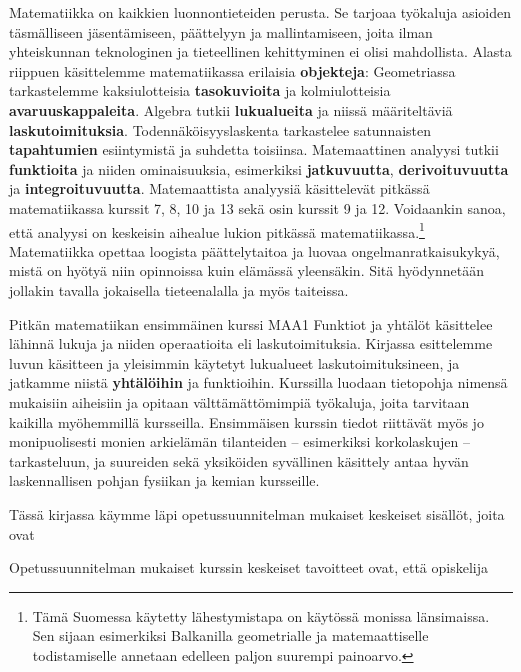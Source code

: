 Matematiikka on kaikkien luonnontieteiden perusta. Se tarjoaa työkaluja asioiden täsmälliseen jäsentämiseen, päättelyyn ja mallintamiseen, joita ilman yhteiskunnan teknologinen ja tieteellinen kehittyminen ei olisi mahdollista. Alasta riippuen käsittelemme matematiikassa erilaisia \textbf{objekteja}: Geometriassa tarkastelemme kaksiulotteisia \textbf{tasokuvioita} ja kolmiulotteisia \textbf{avaruuskappaleita}. Algebra tutkii \textbf{lukualueita} ja niissä määriteltäviä \textbf{laskutoimituksia}. Todennäköisyyslaskenta tarkastelee satunnaisten \textbf{tapahtumien} esiintymistä ja suhdetta toisiinsa. Matemaattinen analyysi tutkii \textbf{funktioita} ja niiden ominaisuuksia, esimerkiksi \textbf{jatkuvuutta}, \textbf{derivoituvuutta} ja \textbf{integroituvuutta}. Matemaattista analyysiä käsittelevät pitkässä matematiikassa kurssit 7, 8, 10 ja 13 sekä osin kurssit 9 ja 12. Voidaankin sanoa, että analyysi on keskeisin aihealue lukion pitkässä matematiikassa.\footnote[1]{Tämä Suomessa käytetty lähestymistapa on käytössä monissa länsimaissa. Sen sijaan esimerkiksi Balkanilla geometrialle ja matemaattiselle todistamiselle annetaan edelleen paljon suurempi painoarvo.} Matematiikka opettaa loogista päättelytaitoa ja luovaa ongelmanratkaisukykyä, mistä on hyötyä niin opinnoissa kuin elämässä yleensäkin. Sitä hyödynnetään jollakin tavalla jokaisella tieteenalalla ja myös taiteissa. 

Pitkän matematiikan ensimmäinen kurssi MAA1 Funktiot ja yhtälöt käsittelee lähinnä lukuja ja niiden operaatioita eli laskutoimituksia. Kirjassa esittelemme luvun käsitteen ja yleisimmin käytetyt lukualueet laskutoimituksineen, ja jatkamme niistä \textbf{yhtälöihin} ja funktioihin. Kurssilla luodaan tietopohja nimensä mukaisiin aiheisiin ja opitaan välttämättömimpiä työkaluja, joita tarvitaan kaikilla myöhemmillä kursseilla. Ensimmäisen kurssin tiedot riittävät myös jo monipuolisesti monien arkielämän tilanteiden -- esimerkiksi korkolaskujen -- tarkasteluun, ja suureiden sekä yksiköiden syvällinen käsittely antaa hyvän laskennallisen pohjan fysiikan ja kemian kursseille.

Tässä kirjassa käymme läpi opetussuunnitelman mukaiset keskeiset sisällöt, joita ovat

Opetussuunnitelman mukaiset kurssin keskeiset tavoitteet ovat, että opiskelija
